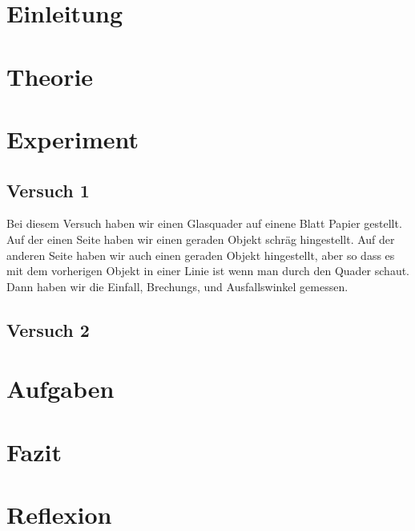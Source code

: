 \documentclass[12pt, a4paper, twoside]{article}
\begin{document}
\section{Einleitung}
\section{Theorie}
\section{Experiment}
\subsection{Versuch 1}
Bei diesem Versuch haben wir einen Glasquader auf einene Blatt Papier gestellt.
Auf der einen Seite haben wir einen geraden Objekt schräg hingestellt.
Auf der anderen Seite haben wir auch einen geraden Objekt hingestellt, 
aber so dass es mit dem vorherigen Objekt in einer Linie ist wenn man durch den Quader schaut.
Dann haben wir die Einfall, Brechungs, und Ausfallswinkel gemessen.



\subsection{Versuch 2}
\section{Aufgaben}
\section{Fazit}
\section{Reflexion}
\end{document}

